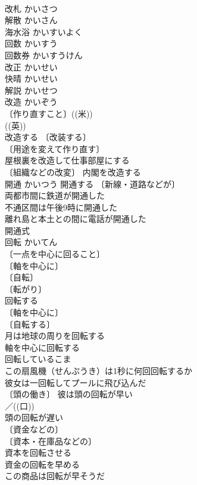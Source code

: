 \documentclass[8pt]{extreport}
\begin{document}
\begin{CJK}{UTF8}{min}
\\	改札	かいさつ	
\\	解散	かいさん	
\\	海水浴	かいすいよく	
\\	回数	かいすう	
\\	回数券	かいすうけん	
\\	改正	かいせい	
\\	快晴	かいせい	
\\	解説	かいせつ	
\\	改造	かいぞう	
\\	〔作り直すこと〕((米)) 
\\	((英)) 
\\	改造する 〔改装する〕
\\	〔用途を変えて作り直す〕
\\	屋根裏を改造して仕事部屋にする 
\\	〔組織などの改変〕 内閣を改造する 
\\	開通	かいつう	開通する 〔新線・道路などが〕
\\	両都市間に鉄道が開通した 
\\	不通区間は午後9時に開通した 
\\	離れ島と本土との間に電話が開通した 
\\	開通式 
\\	回転	かいてん	
\\	〔一点を中心に回ること〕
\\	〔軸を中心に〕
\\	〔自転〕
\\	〔転がり〕
\\	回転する 
\\	〔軸を中心に〕
\\	〔自転する〕
\\	月は地球の周りを回転する 
\\	軸を中心に回転する 
\\	回転しているこま 
\\	この扇風機（せんぷうき）は1秒に何回回転するか 
\\	彼女は一回転してプールに飛び込んだ 
\\	〔頭の働き〕 彼は頭の回転が早い 
\\	／((口)) 
\\	頭の回転が遅い 
\\	〔資金などの〕
\\	〔資本・在庫品などの〕
\\	資本を回転させる 
\\	資金の回転を早める 
\\	この商品は回転が早そうだ 

\end{CJK}
\end{document}

